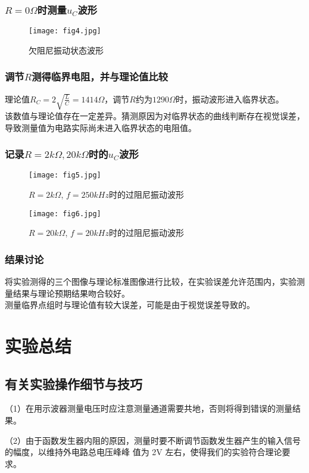 \documentclass[UTF-8,twoside,cs4size]{ctexart}
\begin{document}
        \subsubsection{$R=0\Omega$时测量$u_C$波形}
        \begin{figure}[!h]
            \centering
            \texttt{[image: fig4.jpg]}
            \caption{欠阻尼振动状态波形}
        \end{figure}
        \subsubsection{调节$R$测得临界电阻，并与理论值比较}
        理论值$R_C=2\sqrt{\frac{L}{C}}=1414\Omega$，调节$R$约为$1290\Omega$时，振动波形进入临界状态。  \\
        该数值与理论值存在一定差异。猜测原因为对临界状态的曲线判断存在视觉误差，导致测量值为电路实际尚未进入临界状态的电阻值。
        \subsubsection{记录$R=2k\Omega,20k\Omega$时的$u_C$波形}
        \begin{figure}[!h]
            \centering
            \texttt{[image: fig5.jpg]}
            \caption{$R=2k\Omega$, $f=250kHz$时的过阻尼振动波形}
        \end{figure}
        \begin{figure}[!h]
            \centering
            \texttt{[image: fig6.jpg]}
            \caption{$R=20k\Omega$, $f=20kHz$时的过阻尼振动波形}
        \end{figure}
        \subsubsection{结果讨论}
        将实验测得的三个图像与理论标准图像进行比较，在实验误差允许范围内，实验测量结果与理论预期结果吻合较好。\\
        测量临界点组时与理论值有较大误差，可能是由于视觉误差导致的。\\

\section{实验总结}
\subsection{有关实验操作细节与技巧}
（1）在用示波器测量电压时应注意测量通道需要共地，否则将得到错误的测量结果。\par
（2）由于函数发生器内阻的原因，测量时要不断调节函数发生器产生的输入信号的幅度，以维持外电路总电压峰峰
值为 2V 左右，使得我们的实验符合理论要求。\par
\end{document}
